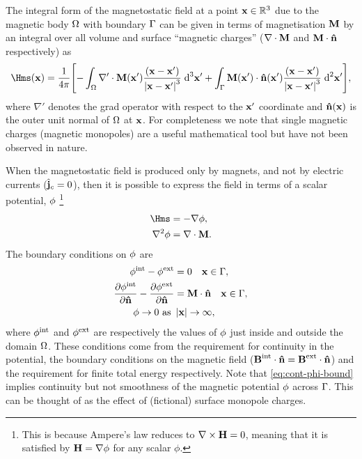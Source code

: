 The integral form of the magnetostatic field at a point $\boldsymbol{\mathrm{x}} \in \mathbb{R}^3$ due to the magnetic body $\Omega$ with boundary ${\Gamma}$ can be given in terms of magnetisation $\boldsymbol{\mathrm{M}}$ by an integral over all volume and surface ``magnetic charges'' ($\nabla \cdot \boldsymbol{\mathrm{M}}$ and $\boldsymbol{\mathrm{M}} \cdot \boldsymbol{\mathrm{\hat{n}}}$ respectively) as
\begin{equation}
  \Hms(\xv) = \frac{1}{4 \pi} \bigs{
    - \int_\magd \nabla' \cdot \Mv(\xv') \frac{(\xv - \xv')}{\abs{\xv -\xv'}^3} \d^3 \xv'
    + \int_\boundd \Mv(\xv') \cdot \nv(\xv') \frac{(\xv - \xv')}{\abs{\xv - \xv'}^3} \d^2 \xv' },
  \label{eq:Hmsint}
\end{equation}
where $\nabla'$ denotes the grad operator with respect to the $\boldsymbol{\mathrm{x}}'$ coordinate and $\boldsymbol{\mathrm{\hat{n}}}(\boldsymbol{\mathrm{x}})$ is the outer unit normal of $\Omega$ at $\boldsymbol{\mathrm{x}}$.
For completeness we note that single magnetic charges (magnetic monopoles) are a useful mathematical tool but have not been observed in nature.

When the magnetostatic field is produced only by magnets, and not by electric currents (\ie ${\hat{\mathbf{j}}}_c = 0$), then it is possible to express the field in terms of a scalar potential, $\phi$ \cite[46]{Coey2010}\footnote{This is because Ampere's law reduces to $\nabla \times \boldsymbol{\mathrm{H}} = 0$, meaning that it is satisfied by $\boldsymbol{\mathrm{H}} = \nabla \phi$ for any scalar $\phi$.}
\begin{equation}
  \begin{aligned}
    \label{eq:Hms}
    \Hms &= - \grad \phim, \\
    \lap \phim &= \div \Mv.
  \end{aligned}
\end{equation}
The boundary conditions on $\phi$ are
\begin{equation}
  \begin{aligned}
    \label{eq:cont-phi-bound}
    \phi^{\mathrm{int}} - \phi^{\mathrm{ext}} &= 0 \quad \boldsymbol{\mathrm{x}} \in {\Gamma}, \\
    \frac{\partial \phi^{\mathrm{int}}}{\partial \boldsymbol{\mathrm{\hat{n}}}} - \frac{\partial \phi^{\mathrm{ext}}}{\partial \boldsymbol{\mathrm{\hat{n}}}} &= \boldsymbol{\mathrm{M}} \cdot \boldsymbol{\mathrm{\hat{n}}} \quad \boldsymbol{\mathrm{x}} \in {\Gamma}, \\
    \phi \rightarrow 0 \text{ as } &\left|{\boldsymbol{\mathrm{x}}} \right| \rightarrow \infty,
  \end{aligned}
\end{equation}
where $\phi^{\mathrm{int}}$ and $\phi^{\mathrm{ext}}$ are respectively the values of $\phi$ just inside and outside the domain $\Omega$.
These conditions come from the requirement for continuity in the potential, the boundary conditions on the magnetic field ($\boldsymbol{\mathrm{B}}^\text{int} \cdot \boldsymbol{\mathrm{\hat{n}}} = \boldsymbol{\mathrm{B}}^\text{ext} \cdot \boldsymbol{\mathrm{\hat{n}}}$) and the requirement for finite total energy respectively.
Note that \cref{eq:cont-phi-bound} implies continuity but not smoothness of the magnetic potential $\phi$ across ${\Gamma}$.
This can be thought of as the effect of (fictional) surface monopole charges.

